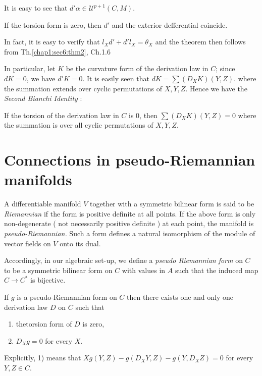 It is easy to see that $ d' \alpha \in \mathscr{U}^{p+1} ( C,M ) $.

\begin{theorem}\label{chap1:sec11:thm3}%
  If the torsion form is zero, then $d'$ and the exterior defferential\pageoriginale
  coincide. 
\end{theorem}

In fact, it is easy to verify that $ l_X d' + d' l_X = \theta_X $ and
the theorem then follows from Th.\ref{chap1:sec6:thm2}, Ch.1.6  

In particular, let $K$ be the curvature form of the derivation law in
$C$; since $ dK = 0 $, we have $ d' K = 0 $. It is easily seen that $
d K = \sum ( D_X K ) ( Y,Z ) $. where the summation extends over
cyclic permutations of $X, Y, Z$. Hence we have the  \textit{ Second
  Bianchi Identity }: 

If  the torsion of the  derivation law in $C$ is  $0$, then $ \sum (
D_X K ) ( Y,Z ) = 0 $ where the summation is over all cyclic
permutations of  $ X,Y,Z $.  

\section{Connections in pseudo-Riemannian manifolds}\label{chap1:sec12} %

A differentiable manifold $V$ together with a symmetric bilinear form
is said  to be \textit{Riemannian } if the form is positive definite
at all points. If the above form is only non-degenerate ( not
necessarily positive definite )  at each point, the manifold is
\textit{pseudo-Riemannian.} Such a form defines a natural isomorphism
of the module of  vector fields on $V$ onto its dual. 

Accordingly, in our algebraic set-up, we define a \textit{pseudo
  Riemannian form} on $C$ to be a symmetric bilinear form on $C$ with
values in $A$ such that the induced map $ C \to C^* $ is bijective. 

\begin{theorem}\label{chap1:sec12:thm4} %
  If $g$ is a pseudo-Riemannian form on $C$ then there exists one and
  only one derivation law $D$ on $C$ such that  
  \begin{enumerate}[\rm 1)]
  \item the\pageoriginale torsion form of $D$ is zero,
  \item $ D_X g = 0 $ for every $X$.
  \end{enumerate} 
 
  Explicitly, 1) means that $X g ( Y,Z ) - g ( D_X Y,Z ) - g (
  Y,D_X Z ) = 0$ for every $Y,Z \in C$.  
\end{theorem} 

